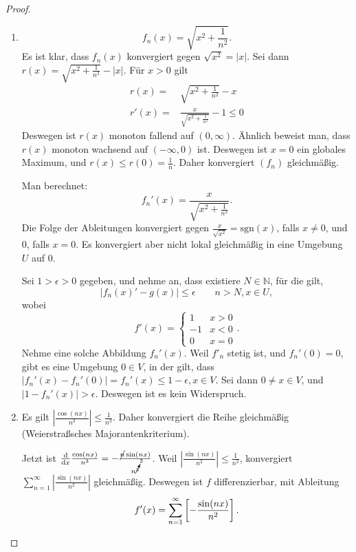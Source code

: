 \documentclass[prb,12pt]{revtex4-2}
\theoremstyle{definition}
\theoremstyle{definition}
\newcommand{\N}{\mathbb{N}}
\begin{document}
\begin{proof}
	\begin{enumerate}[label=\roman*)]
		\item \[
		f_n(x)=\sqrt{x^2+\frac{1}{n^2}} 
		.\] 
		Es ist klar, dass $f_n(x)$ konvergiert gegen $\sqrt{x^2} =|x|$. Sei dann $r(x)=\sqrt{x^2+\frac{1}{n^2}} -|x|$. F\"{u}r $x>0$ gilt
		\begin{align*}
			r(x)=& \sqrt{x^2+\frac{1}{n^2}}-x\\
			r'(x)=& \frac{x}{\sqrt{x^2+\frac{1}{n^2}} }-1\le 0
		\end{align*}
		Deswegen ist $r(x)$ monoton fallend auf $(0,\infty)$. Ähnlich beweist man, dass $r(x)$ monoton wachsend auf $(-\infty, 0)$ ist. Deswegen ist $x=0$ ein globales Maximum, und $r(x)\le r(0)=\frac{1}{n}$. Daher konvergiert $(f_n)$ gleichmäßig.

		Man berechnet:
		\[
			f_n'(x)=\frac{x}{\sqrt{x^2+\frac{1}{n^2}} }
		.\] 
		Die Folge der Ableitungen konvergiert gegen $\frac{x}{\sqrt{x^2} }=\text{sgn}(x)$, falls $x\neq 0$, und $0$, falls $x=0$. Es konvergiert aber nicht lokal gleichmäßig in eine Umgebung $U$ auf $0$.

		Sei $1>\epsilon>0$ gegeben, und nehme an, dass existiere $N\in \N$, f\"{u}r die gilt, 
		\[
		|f_n(x)'-g(x)|\le \epsilon\qquad n>N,x\in U
		,\] 
		wobei
		\[
		f'(x)=\begin{cases}
			1 & x > 0\\
			-1 & x < 0\\
			0 & x = 0
		\end{cases}
		.\] 
Nehme eine solche Abbildung $f_n'(x)$. Weil $f'_n$ stetig ist, und $f_n'(0)=0$, gibt es eine Umgebung $0\in V$, in der gilt, dass $|f_n'(x)-f_n'(0)|=f_n'(x)\le 1-\epsilon, x\in V$. Sei dann  $0\neq x\in V$, und $|1-f_n'(x)|>\epsilon$. Deswegen ist es kein Widerspruch.

\item Es gilt $\left|\frac{\cos(nx)}{n^3}\right|\le \frac{1}{n^3}$. Daher konvergiert die Reihe gleichmäßig (Weierstraßsches Majorantenkriterium).

	Jetzt ist $\dv{x} \frac{\cos(nx)}{n^3}=-\frac{\cancel{n}\sin(nx)}{n^{\cancelto{2}{3}}}$. Weil $\left|\frac{\sin(nx)}{n^2}\right|\le \frac{1}{n^2}$, konvergiert $\sum_{n=1}^{\infty} \left| \frac{\sin(nx)}{n^2} \right|$ gleichmäßig. Deswegen ist $f$ differenzierbar, mit Ableitung
	\[
		f'(x)=\sum_{n=1}^{\infty} \left[ -\frac{\sin(nx)}{n^2} \right] 
	.\qedhere\] 
\end{enumerate}
\end{proof}
\end{document}
